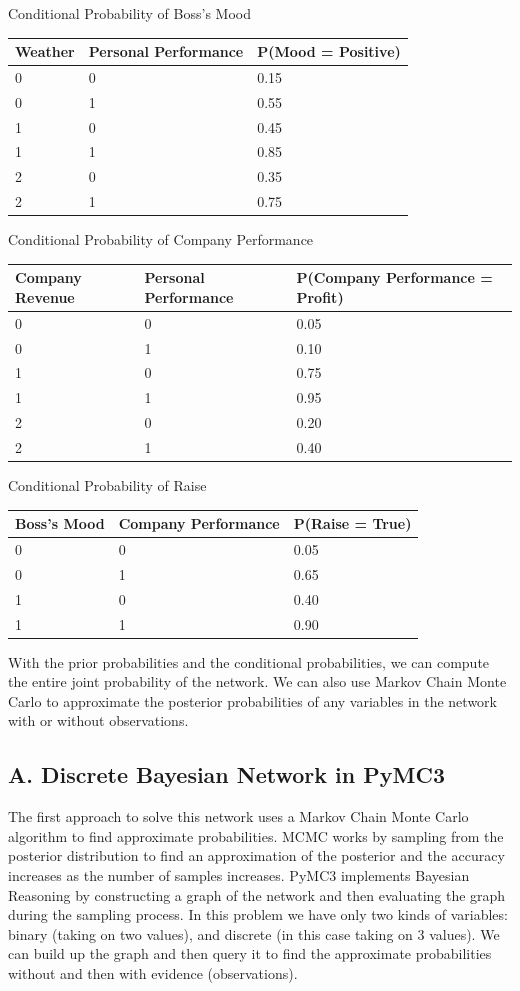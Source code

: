 \documentclass[12pt]{article}
\begin{document}
Conditional Probability of Boss's Mood

\begin{longtable}[]{@{}lll@{}}
\toprule
Weather & Personal Performance & P(Mood = Positive)\tabularnewline
\midrule
\endhead
0 & 0 & 0.15\tabularnewline
0 & 1 & 0.55\tabularnewline
1 & 0 & 0.45\tabularnewline
1 & 1 & 0.85\tabularnewline
2 & 0 & 0.35\tabularnewline
2 & 1 & 0.75\tabularnewline
\bottomrule
\end{longtable}

Conditional Probability of Company Performance

\begin{longtable}[]{@{}lll@{}}
\toprule
Company Revenue & Personal Performance & P(Company Performance =
Profit)\tabularnewline
\midrule
\endhead
0 & 0 & 0.05\tabularnewline
0 & 1 & 0.10\tabularnewline
1 & 0 & 0.75\tabularnewline
1 & 1 & 0.95\tabularnewline
2 & 0 & 0.20\tabularnewline
2 & 1 & 0.40\tabularnewline
\bottomrule
\end{longtable}

Conditional Probability of Raise

\begin{longtable}[]{@{}lll@{}}
\toprule
Boss's Mood & Company Performance & P(Raise = True)\tabularnewline
\midrule
\endhead
0 & 0 & 0.05\tabularnewline
0 & 1 & 0.65\tabularnewline
1 & 0 & 0.40\tabularnewline
1 & 1 & 0.90\tabularnewline
\bottomrule
\end{longtable}

With the prior probabilities and the conditional probabilities, we can
compute the entire joint probability of the network. We can also use
Markov Chain Monte Carlo to approximate the posterior probabilities of
any variables in the network with or without observations.

    \hypertarget{a.-discrete-bayesian-network-in-pymc3}{%
\subsection{A. Discrete Bayesian Network in
PyMC3}\label{a.-discrete-bayesian-network-in-pymc3}}

The first approach to solve this network uses a Markov Chain Monte Carlo
algorithm to find approximate probabilities. MCMC works by sampling from
the posterior distribution to find an approximation of the posterior and
the accuracy increases as the number of samples increases. PyMC3
implements Bayesian Reasoning by constructing a graph of the network and
then evaluating the graph during the sampling process. In this problem
we have only two kinds of variables: binary (taking on two values), and
discrete (in this case taking on 3 values). We can build up the graph
and then query it to find the approximate probabilities without and then
with evidence (observations).
\end{document}
